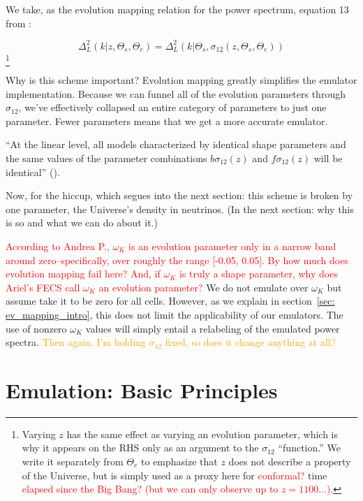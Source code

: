 We take, as the evolution mapping relation for the power spectrum, equation 13
from :

\begin{equation}
\label{eq: evMapping_pSpectrum}
    \Delta^2_L (k | z, \Theta_s, \Theta_e)
    =
    \Delta_L^2 (k | \Theta_s, \sigma_{12} \left( z, \Theta_s, \Theta_e \right))
\end{equation}\footnote{Varying $z$ has the same effect as varying an
evolution parameter, which is why it appears on the RHS only as an argument to
the $\sigma_{12}$ ``function.'' We write it separately from $\Theta_e$ to
emphasize that $z$ does not describe a property of the Universe, but is
simply used as a proxy here for \textcolor{red}{conformal?} time
\textcolor{red}{elapsed since the Big Bang? (but we can only observe up to
$z = 1100$...)}.}

Why is this scheme important? Evolution mapping greatly simplifies the emulator
implementation. Because we can
funnel all of the evolution parameters through $\sigma_{12}$, we've effectively
collapsed an entire category of parameters to just one parameter. Fewer
parameters means that we get a more accurate emulator.

``At the linear level, all models characterized by identical shape parameters
and the same values of the parameter combinations $b \sigma_{12}(z)$ and
$f \sigma_{12}(z)$ will be identical'' ().

Now, for the hiccup, which segues into the next section: this scheme is broken by one parameter, the Universe's
density in neutrinos. (In the next section: why this is so and what we can do
about it.)


\textcolor{red}{According to Andrea P., $\omega_K$ is an evolution parameter 
only in a narrow 
band around zero--specifically, over roughly the range [-0.05, 0.05].
By how much does evolution mapping fail here? And, if 
$\omega_K$ is truly a shape parameter, why does Ariel's FECS call $\omega_K$
an evolution parameter?} We do not emulate over $\omega_K$ but assume take
it to be zero for all cells. However, as we explain in
section~\ref{sec: ev_mapping_intro}, this does not limit the applicability of
our emulators. The use of nonzero $\omega_K$ values will simply entail a
relabeling of the emulated power spectra. \textcolor{orange}{Then again, I'm
holding $\sigma_{12}$ fixed, so does it change anything at all?}

\section{Emulation: Basic Principles}
\label{sec: emulation_intro}

